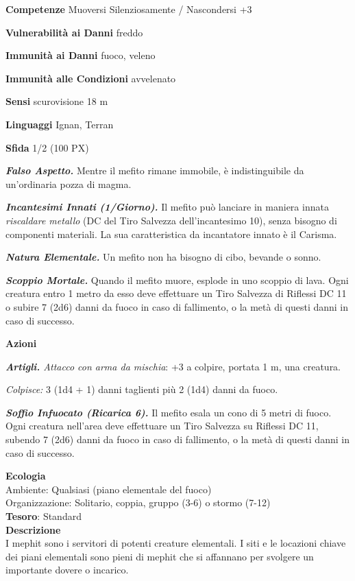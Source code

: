 \begin{multicols}{2}
\textbf{Competenze} Muoversi Silenziosamente / Nascondersi +3

\textbf{Vulnerabilità ai Danni} freddo

\textbf{Immunità ai Danni} fuoco, veleno

\textbf{Immunità alle Condizioni} avvelenato

\textbf{Sensi} scurovisione 18 m

\textbf{Linguaggi} Ignan, Terran

\textbf{Sfida} 1/2 (100 PX)

\textit{\textbf{Falso Aspetto.}} Mentre il mefito rimane immobile, è indistinguibile da un'ordinaria pozza di magma.

\textit{\textbf{Incantesimi Innati (1/Giorno).}} Il mefito può lanciare in maniera innata \textit{riscaldare metallo} (DC del Tiro Salvezza dell'incantesimo 10), senza bisogno di componenti materiali. La sua caratteristica da incantatore innato è il Carisma.

\textit{\textbf{Natura Elementale.}} Un mefito non ha bisogno di cibo, bevande o sonno.

\textit{\textbf{Scoppio Mortale.}} Quando il mefito muore, esplode in uno scoppio di lava. Ogni creatura entro 1 metro da esso deve effettuare un Tiro Salvezza di Riflessi DC 11 o subire 7 (2d6) danni da fuoco in caso di fallimento, o la metà di questi danni in caso di successo.

\textbf{Azioni}

\textit{\textbf{Artigli.} Attacco con arma da mischia}: +3 a colpire, portata 1 m, una creatura.

\textit{Colpisce:} 3 (1d4 + 1) danni taglienti più 2 (1d4) danni da fuoco.

\textit{\textbf{Soffio Infuocato (Ricarica 6).}} Il mefito esala un cono di 5 metri di fuoco. Ogni creatura nell'area deve effettuare un Tiro Salvezza su Riflessi DC 11, subendo 7 (2d6) danni da fuoco in caso di fallimento, o la metà di questi danni in caso di successo.

\textbf{Ecologia}\\
Ambiente: Qualsiasi (piano elementale del fuoco)\\
Organizzazione: Solitario, coppia, gruppo (3-6) o stormo (7-12)\\
\textbf{Tesoro}: Standard\\
\textbf{Descrizione}\\
I mephit sono i servitori di potenti creature elementali. I siti e le locazioni chiave dei piani elementali sono pieni di mephit che si affannano per svolgere un importante dovere o incarico.


\end{multicols}
